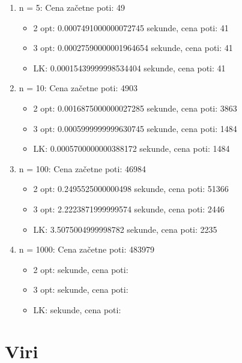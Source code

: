 \documentclass[12pt, a4paper]{article}
\begin{document}
\begin{enumerate}

\item n = 5:
Cena začetne poti: 49
\begin{itemize}

\item 2 opt: 0.0007491000000072745 sekunde, cena poti: 41
\item 3 opt: 0.00027590000001964654 sekunde, cena poti: 41
\item LK: 0.00015439999998534404 sekunde, cena poti: 41
\end{itemize}

\item n = 10:
Cena začetne poti: 4903
\begin{itemize} 

\item 2 opt: 0.0016875000000027285 sekunde, cena poti: 3863
\item 3 opt: 0.0005999999999630745 sekunde, cena poti: 1484
\item LK: 0.0005700000000388172 sekunde, cena poti: 1484
\end{itemize}

\item n = 100:
Cena začetne poti: 46984
\begin{itemize}

\item 2 opt: 0.2495525000000498 sekunde, cena poti: 51366
\item 3 opt:  2.2223871999999574 sekunde, cena poti: 2446
\item LK: 3.5075004999998782 sekunde, cena poti: 2235
\end{itemize}

\item n = 1000:
Cena začetne poti: 483979
\begin{itemize}

\item 2 opt:  sekunde, cena poti: 
\item 3 opt:   sekunde, cena poti: 
\item LK:  sekunde, cena poti: 
\end{itemize}

\end{enumerate}

\newpage
\section[Viri]{Viri}
\end{document}
